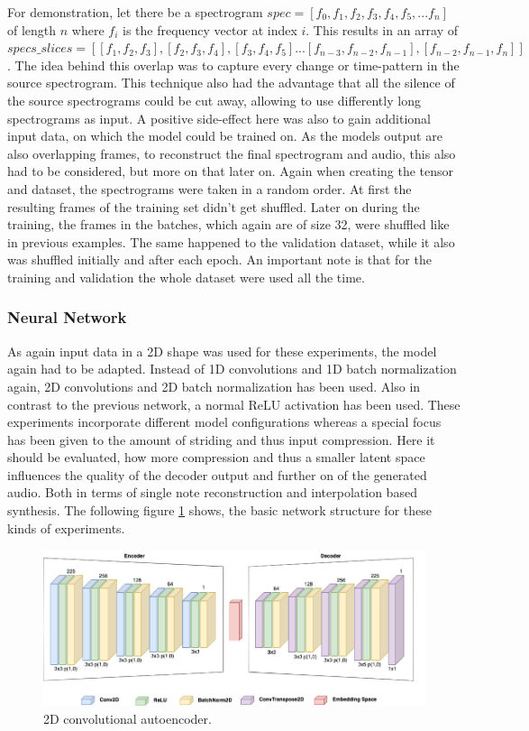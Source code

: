 For demonstration, let there be a spectrogram $spec=[f_0, f_1, f_2, f_3, f_4, f_5, ... f_n]$ of length $n$ where $f_i$ is the frequency vector at index $i$. This results in an array of $specs\_slices=[[f_1, f_2, f_3], [f_2, f_3, f_4], [f_3, f_4, f_5] ... [f_{n-3}, f_{n-2}, f_{n-1}], [f_{n-2}, f_{n-1}, f_n]]$. The idea behind this overlap was to capture every change or time-pattern in the source spectrogram. This technique also had the advantage that all the silence of the source spectrograms could be cut away, allowing to use differently long spectrograms as input. A positive side-effect here was also to gain additional input data, on which the model could be trained on. As the models output are also overlapping frames, to reconstruct the final spectrogram and audio, this also had to be considered, but more on that later on. Again when creating the tensor and dataset, the spectrograms were taken in a random order. At first the resulting frames of the training set didn't get shuffled. Later on during the training, the frames in the batches, which again are of size 32, were shuffled like in previous examples. The same happened to the validation dataset, while it also was shuffled initially and after each epoch. An important note is that for the training and validation the whole dataset were used all the time. 

\subsubsection{Neural Network}
As again input data in a 2D shape was used for these experiments, the model again had to be adapted. Instead of 1D convolutions and 1D batch normalization again, 2D convolutions and 2D batch normalization has been used. Also in contrast to the previous network, a normal ReLU activation has been used. These experiments incorporate different model configurations whereas a special focus has been given to the amount of striding and thus input compression. Here it should be evaluated, how more compression and thus a smaller latent space influences the quality of the decoder output and further on of the generated audio. Both in terms of single note reconstruction and interpolation based synthesis. The following figure \ref{fig:exp_2D_cae} shows, the basic network structure for these kinds of experiments.

 \begin{figure}[htb!]
	\caption{2D convolutional autoencoder.}
	\label{fig:exp_2D_cae}
	\centering
	\includegraphics[width=\textwidth]{images/experiments/autoencoder_2D.png}
\end{figure}

